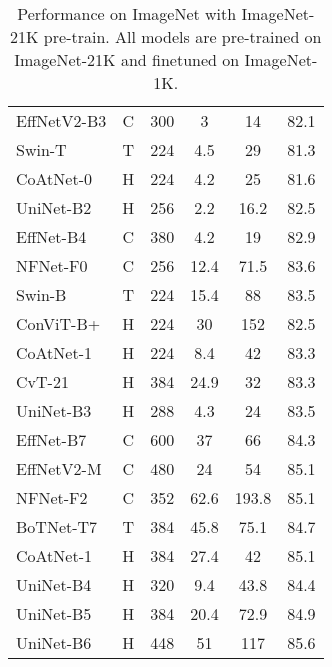 \documentclass[runningheads]{llncs}
\begin{document}
\begin{table}[t]
\begin{minipage}[t]{0.48\linewidth}
{\begin{tabular}{lc|ccc|c}
            EffNetV2-B3 \cite{effnetv2} & C     & 300   & 3     & 14    & 82.1 \\
Swin-T \cite{swin} & T     & 224   & 4.5   & 29    & 81.3 \\
            CoAtNet-0 \cite{coatnet} & H & 224 & 4.2 & 25 & 81.6 \\
\rowcolor{LightCyan}
            UniNet-B2 & H     & 256   & 2.2   & 16.2 & 82.5  \\
            \midrule
            EffNet-B4 \cite{efficientnet} & C     & 380   & 4.2   & 19    & 82.9 \\
            NFNet-F0 \cite{nfnet} & C     & 256   & 12.4  & 71.5  & 83.6 \\
Swin-B \cite{swin} & T     & 224   & 15.4  & 88    & 83.5 \\
ConViT-B+ \cite{convit} & H     & 224   & 30    & 152   & 82.5 \\
            CoAtNet-1 \cite{coatnet} & H & 224 & 8.4 & 42 & 83.3 \\
            CvT-21 \cite{cvt} & H     & 384   & 24.9  & 32    & 83.3 \\
            \rowcolor{LightCyan}
            UniNet-B3 & H     & 288   & 4.3   & 24  & 83.5 \\
            \midrule
            EffNet-B7 \cite{efficientnet} & C     & 600   & 37    & 66    & 84.3 \\
            EffNetV2-M \cite{effnetv2} & C     & 480   & 24    & 54    & 85.1 \\
            NFNet-F2 \cite{nfnet} & C     & 352   & 62.6  & 193.8 & 85.1 \\
            BoTNet-T7 \cite{botnet} & T     & 384   & 45.8  & 75.1  & 84.7 \\
            CoAtNet-1 \cite{coatnet} & H & 384 & 27.4 & 42 & 85.1 \\
            \rowcolor{LightCyan}
            UniNet-B4 & H     & 320   & 9.4   & 43.8  & 84.4 \\
            \rowcolor{LightCyan}
            UniNet-B5 & H     & 384   & 20.4  & 72.9  & 84.9 \\
            \rowcolor{LightCyan}
            UniNet-B6 & H     & 448   & 51  & 117  & 85.6 \\
            \bottomrule
            \end{tabular}}
        \label{tab:sota}\end{minipage}
    \hfill
    \begin{minipage}[t]{0.48\linewidth}
        \centering
        \caption{Performance on ImageNet with ImageNet-21K pre-train. All models are pre-trained on ImageNet-21K and finetuned on ImageNet-1K.}

\end{minipage}
\end{table}
\end{document}

